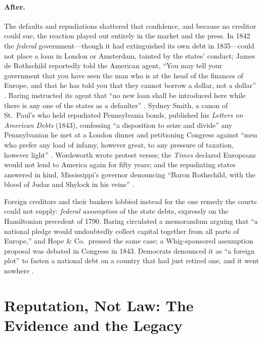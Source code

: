 \documentclass[12pt]{article}
\begin{document}
\paragraph{After.} The defaults and repudiations shattered that confidence, and
because no creditor could sue, the reaction played out entirely in the market and
the press. In 1842 the \emph{federal} government---though it had extinguished its
own debt in 1835---could not place a loan in London or Amsterdam, tainted by the
states' conduct; James de Rothschild reportedly told the American agent, ``You may
tell your government that you have seen the man who is at the head of the finances
of Europe, and that he has told you that they cannot borrow a dollar, not a
dollar'' \citep[39--40]{sexton2005debtor}. Baring instructed its agent that ``no
new loan shall be introduced here while there is any one of the states as a
defaulter'' \citep[39]{sexton2005debtor}. Sydney Smith, a canon of St.\ Paul's who
held repudiated Pennsylvania bonds, published his \emph{Letters on American Debts}
(1843), confessing ``a disposition to seize and divide'' any Pennsylvanian he met
at a London dinner \citep[59]{mcgrane1935foreign} and petitioning Congress against
``men who prefer any load of infamy, however great, to any pressure of taxation,
however light'' \citep[9]{sydneysmith1843letters}. Wordsworth wrote protest
verses; the \emph{Times} declared Europeans would not lend to America again for
fifty years; and the repudiating states answered in kind, Mississippi's governor
denouncing ``Baron Rothschild, with the blood of Judas and Shylock in his veins''
\citep{mcgrane1935foreign}.

Foreign creditors and their bankers lobbied instead for the one remedy the
courts could not supply: \emph{federal assumption} of the state debts, expressly
on the Hamiltonian precedent of 1790. Baring circulated a memorandum arguing that
``a national pledge would undoubtedly collect capital together from all parts of
Europe,'' and Hope \& Co.\ pressed the same case; a Whig-sponsored assumption
proposal was debated in Congress in 1843. Democrats denounced it as ``a foreign
plot'' to fasten a national debt on a country that had just retired one, and it
went nowhere \citep{wallis2004sovereign, mcgrane1935foreign, roberts2012americas}.

\section{Reputation, Not Law: The Evidence and the Legacy}
\label{sec:reputation}
\end{document}
